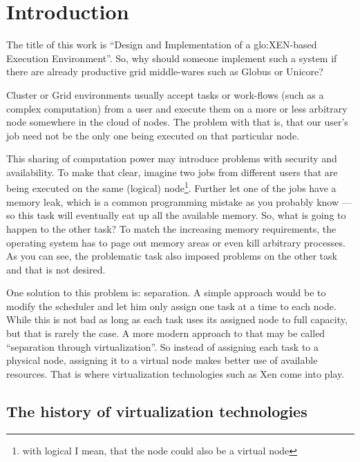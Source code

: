 
\chapter{Introduction}
\label{cha:intro}

The  title  of  this  work   is  ``Design  and  Implementation  of  a
\gls{glo:XEN}-based  Execution  Environment''.  So, why  should  someone
implement such a system if  there are already productive grid middle-wares
such as Globus or Unicore?

Cluster or Grid environments usually accept tasks or work-flows (such as a
complex  computation) from  a user  and  execute them  on a  more or  less
arbitrary node somewhere in the cloud of nodes.  The problem with that is,
that  our user's  job need  not be  the only  one being  executed  on that
particular node.

This sharing of computation power may introduce problems with security and
availability. To  make that clear,  imagine two jobs from  different users
that are being executed on the same (logical) node\footnote{with logical I
  mean, that  the node could also be  a virtual node}. Further  let one of
the jobs have a memory leak,  which is a common programming mistake as you
probably know  --- so this task  will eventually eat up  all the available
memory.  So,  what is  going to happen  to the  other task?  To  match the
increasing  memory requirements,  the  operating system  has  to page  out
memory  areas or  even  kill arbitrary  processes.   As you  can see,  the
problematic task also  imposed problems on the other task  and that is not
desired.

One solution to this problem is: separation. A simple approach would be to
modify the scheduler  and let him only  assign one task at a  time to each
node. While this is not bad as long as each task uses its assigned node to
full capacity, but that is rarely the case. A more modern approach to that
may  be  called  ``separation  through virtualization''.   So  instead  of
assigning each  task to a  physical node, assigning  it to a  virtual node
makes  better use  of available  resources. That  is  where virtualization
technologies such as Xen come into play.

\section{The history of virtualization technologies}
\label{sec:virtualization-history}

